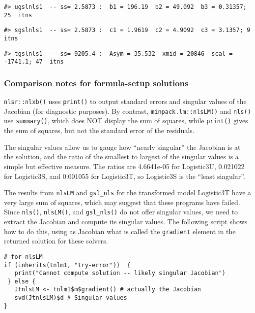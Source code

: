 \begin{verbatim}
#> ugslnls1  -- ss= 2.5873 :  b1 = 196.19  b2 = 49.092  b3 = 0.31357; 25  itns
\end{verbatim}

\begin{verbatim}
#> sgslnls1  -- ss= 2.5873 :  c1 = 1.9619  c2 = 4.9092  c3 = 3.1357; 9  itns
\end{verbatim}

\begin{verbatim}
#> tgslnls1  -- ss= 9205.4 :  Asym = 35.532  xmid = 20846  scal = -1741.1; 47  itns
\end{verbatim}

\hypertarget{comparison-notes-for-formula-setup-solutions}{%
\subsubsection{Comparison notes for formula-setup solutions}\label{comparison-notes-for-formula-setup-solutions}}

\texttt{nlsr::nlxb()} uses \texttt{print()} to output standard errors and
singular values of the Jacobian (for diagnostic purposes). By contrast,
\texttt{minpack.lm::nlsLM()} and \texttt{nls()}
use \texttt{summary()}, which does NOT display the sum of squares, while \texttt{print()}
gives the sum of squares, but not the standard error of the residuals.

The singular values allow us to gauge how ``nearly singular'' the
Jacobian is at the solution, and the ratio of the smallest to largest of the
singular values is a simple but effective measure. The ratios are
4.6641e-05 for Logistic3U, 0.021022 for Logistic3S, and 0.001055 for
Logistic3T, so Logistic3S is the ``least singular''.

The results from \texttt{nlsLM} and \texttt{gsl\_nls} for the transformed model Logistic3T have a very
large sum of squares, which may suggest that these programs have failed.
Since \texttt{nls()}, \texttt{nlsLM()}, and \texttt{gsl\_nls()} do not
offer singular values, we need to extract the Jacobian and compute its
singular values. The following script shows how to do this, using as Jacobian what is called
the \texttt{gradient} element in the returned solution for these solvers.

\begin{verbatim}
# for nlsLM
if (inherits(tnlm1, "try-error"))  {
   print("Cannot compute solution -- likely singular Jacobian")
 } else {  
   JtnlsLM <- tnlm1$m$gradient() # actually the Jacobian
   svd(JtnlsLM)$d # Singular values
}   
\end{verbatim}

